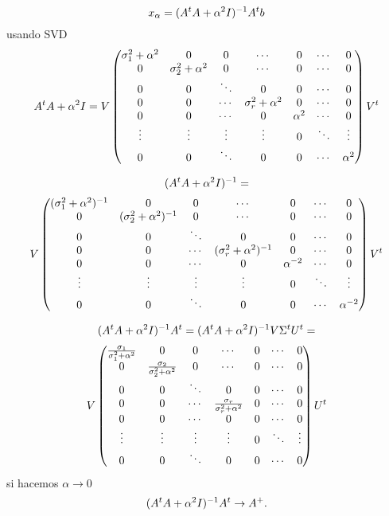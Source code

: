  $$
 \xb_\alpha= (\Ab^t\Ab+\alpha^2 \Ib)^{-1}\Ab^t\bb
 $$
usando SVD
$$
\Ab^t\Ab+\alpha^2 \Ib=\Vb \begin{pmatrix}
\sigma_1^2+\alpha^2&0&0&\cdots &0&\cdots &0\\
0&\sigma_2^2+\alpha^2&0&\cdots &0&\cdots &0\\
0&0&\ddots&0&0&\cdots &0\\
0&0&\cdots&\sigma_r^2+\alpha^2&0&\cdots &0\\
0&0&\cdots&0&\alpha^2&\cdots &0\\
\vdots&\vdots&\vdots&\vdots&0&\ddots&\vdots\\
0&0&\ddots&0&0&\cdots &\alpha^2
\end{pmatrix} \Vb^t
$$

$$
(\Ab^t\Ab+\alpha^2 \Ib)^{-1}=$$
$$\Vb \begin{pmatrix}
(\sigma_1^2+\alpha^2)^{-1}&0&0&\cdots &0&\cdots &0\\
0&(\sigma_2^2+\alpha^2)^{-1}&0&\cdots &0&\cdots &0\\
0&0&\ddots&0&0&\cdots &0\\
0&0&\cdots&(\sigma_r^2+\alpha^2)^{-1}&0&\cdots &0\\
0&0&\cdots&0&\alpha^{-2}&\cdots &0\\
\vdots&\vdots&\vdots&\vdots&0&\ddots&\vdots\\
0&0&\ddots&0&0&\cdots &\alpha^{-2}
\end{pmatrix} \Vb^t
$$


$$
(\Ab^t\Ab+\alpha^2 \Ib)^{-1}\Ab^t=(\Ab^t\Ab+\alpha^2 \Ib)^{-1}\Vb\Sigmab^t\Ub^t=
$$
$$\Vb \begin{pmatrix}
\frac{\sigma_1}{\sigma_1^2+\alpha^2}&0&0&\cdots &0&\cdots &0\\
0&\frac{\sigma_2}{\sigma_2^2+\alpha^2}&0&\cdots &0&\cdots &0\\
0&0&\ddots&0&0&\cdots &0\\
0&0&\cdots&\frac{\sigma_r}{\sigma_r^2+\alpha^2}&0&\cdots &0\\
0&0&\cdots&0&0&\cdots &0\\
\vdots&\vdots&\vdots&\vdots&0&\ddots&\vdots\\
0&0&\ddots&0&0&\cdots &0
\end{pmatrix} \Ub^t
$$
 si hacemos $\alpha\to 0$
 $$
 (\Ab^t\Ab+\alpha^2 \Ib)^{-1}\Ab^t \to \Ab^+.
 $$




